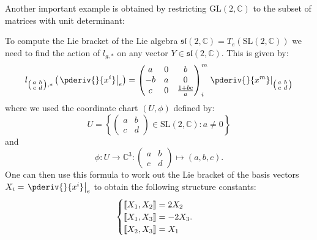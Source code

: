     Another important example is obtained by restricting $\text{GL}(2, \mathbb{C})$ to the subset of matrices with unit determinant:
    \begin{example}
        To compute the Lie bracket of the Lie algebra $\mathfrak{sl}(2, \mathbb{C}) = T_e(\text{SL}(2, \mathbb{C}))$ we need to find the action of $l_{g, *}$ on any vector $Y\in\mathfrak{sl}(2, \mathbb{C})$. This is given by:
        \begin{gather}
            l_{\left(\begin{smallmatrix}a&b\\c&d\end{smallmatrix}\right), *}\left(\left.\pderiv{}{x^i}\right|_e\right)
            = \left(\begin{matrix}a&0&b\\-b&a&0\\c&0&\frac{1+bc}{a}\end{matrix}\right)^m_i\left.\pderiv{}{x^m}\right|_{\left(\begin{smallmatrix}a&b\\c&d\end{smallmatrix}\right)}
        \end{gather}
        where we used the coordinate chart $(U, \phi)$ defined by: \[U = \left\{\left(\begin{matrix}a&b\\c&d\end{matrix}\right)\in\text{SL}(2, \mathbb{C}): a\neq0\right\}\] and \[\phi:U\rightarrow\mathbb{C}^3:\left(\begin{matrix}a&b\\c&d\end{matrix}\right)\mapsto(a, b, c).\] One can then use this formula to work out the Lie bracket of the basis vectors $X_i = \left.\pderiv{}{x^i}\right|_e$ to obtain the following structure constants:
        \begin{gather}
            \label{lie:sl2c_lie_brackets}
            \begin{cases}
                \text{\textlbrackdbl}X_1, X_2\text{\textrbrackdbl} = 2X_2\\
                \text{\textlbrackdbl}X_1, X_3\text{\textrbrackdbl} = -2X_3.\\
                \text{\textlbrackdbl}X_2, X_3\text{\textrbrackdbl} = X_1
            \end{cases}
        \end{gather}
    \end{example}

